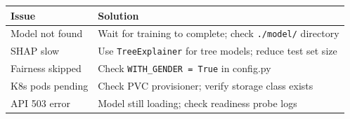\documentclass[11pt,a4paper]{article}
\begin{document}
\begin{table}[H]
\centering
\small
\begin{tabular}{@{}p{4cm}p{8cm}@{}}
\toprule
\textbf{Issue} & \textbf{Solution} \\
\midrule
Model not found & Wait for training to complete; check \texttt{./model/} directory \\
SHAP slow & Use \texttt{TreeExplainer} for tree models; reduce test set size \\
Fairness skipped & Check \texttt{WITH\_GENDER = True} in config.py \\
K8s pods pending & Check PVC provisioner; verify storage class exists \\
API 503 error & Model still loading; check readiness probe logs \\
\bottomrule
\end{tabular}
\end{table}
\end{document}
